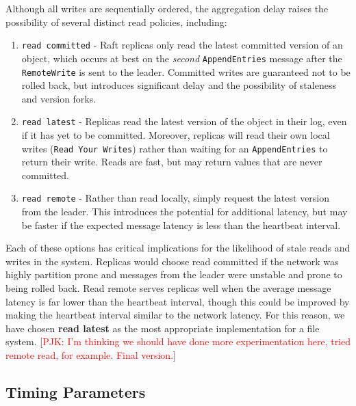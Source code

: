 \documentclass[10pt,conference,letterpaper]{IEEEtran}
\newcommand{\todo}[1]{{\textcolor{red}{#1}}}
\newcommand{\pjk}[1]{[\todo{PJK: #1}]}
\begin{document}
Although all writes are sequentially ordered, the aggregation delay raises the possibility
of several distinct read policies, including:
\begin{enumerate}
    \item \texttt{read committed} - Raft replicas only read the latest committed version
of an object, which occurs at best on the \emph{second} \texttt{AppendEntries} message
after the \texttt{RemoteWrite} is sent to the leader. Committed writes are guaranteed not
to be rolled back, but introduces significant delay and the possibility of staleness and
version forks.
    \item \texttt{read latest} - Replicas read the latest version of the object
in their log, even if it has yet to be committed.
Moreover, replicas will read their own local writes (\texttt{Read Your Writes}) rather than waiting for an
\texttt{AppendEntries} to return their write. Reads are fast, but may return values that
are never committed.
    \item \texttt{read remote} - Rather than read locally, simply request the latest
version from the leader.
This introduces the potential for additional latency, but may be faster if the expected
message latency is less than the heartbeat interval.
\end{enumerate}

Each of these options has critical implications for the likelihood of stale reads and
writes in the system.
Replicas would choose read committed if the network was highly partition prone and
messages from the leader were unstable and prone to being rolled back.
Read remote serves replicas well when the average message latency is far lower than the
heartbeat interval, though this could be improved by making the heartbeat interval similar
to the network latency.
For this reason, we have chosen \textbf{read latest} as the most appropriate implementation for a file
system.
\pjk{I'm thinking we should have done more experimentation here, tried remote read, for
  example. Final version.}

\subsection{Timing Parameters}
\end{document}
